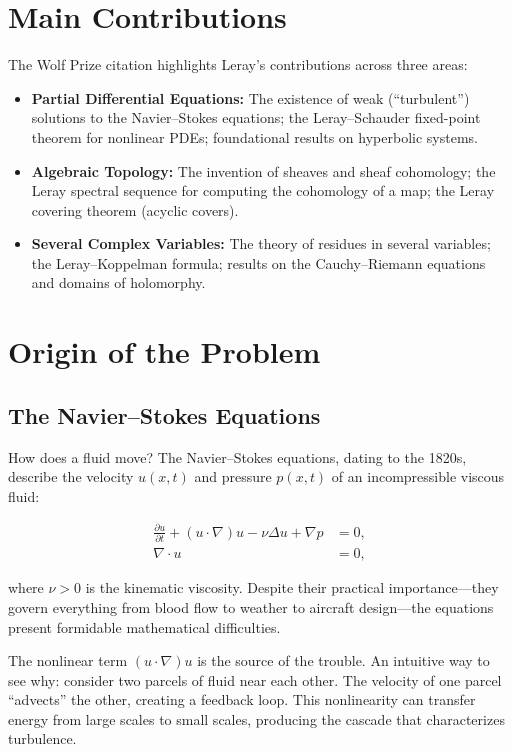 \section{Main Contributions}

The Wolf Prize citation highlights Leray's contributions across three areas:

\begin{itemize}
\item \textbf{Partial Differential Equations:} The existence of weak (``turbulent'') solutions to the Navier--Stokes equations; the Leray--Schauder fixed-point theorem for nonlinear PDEs; foundational results on hyperbolic systems.
\item \textbf{Algebraic Topology:} The invention of sheaves and sheaf cohomology; the Leray spectral sequence for computing the cohomology of a map; the Leray covering theorem (acyclic covers).
\item \textbf{Several Complex Variables:} The theory of residues in several variables; the Leray--Koppelman formula; results on the Cauchy--Riemann equations and domains of holomorphy.
\end{itemize}

\section{Origin of the Problem}

\subsection{The Navier--Stokes Equations}

How does a fluid move? The Navier--Stokes equations, dating to the 1820s, describe the velocity $u(x,t)$ and pressure $p(x,t)$ of an incompressible viscous fluid:

\begin{align*}
\frac{\partial u}{\partial t} + (u \cdot \nabla) u - \nu \Delta u + \nabla p &= 0, \\
\nabla \cdot u &= 0,
\end{align*}

where $\nu > 0$ is the kinematic viscosity. Despite their practical importance---they govern everything from blood flow to weather to aircraft design---the equations present formidable mathematical difficulties.

The nonlinear term $(u \cdot \nabla) u$ is the source of the trouble. An intuitive way to see why: consider two parcels of fluid near each other. The velocity of one parcel ``advects'' the other, creating a feedback loop. This nonlinearity can transfer energy from large scales to small scales, producing the cascade that characterizes turbulence.

